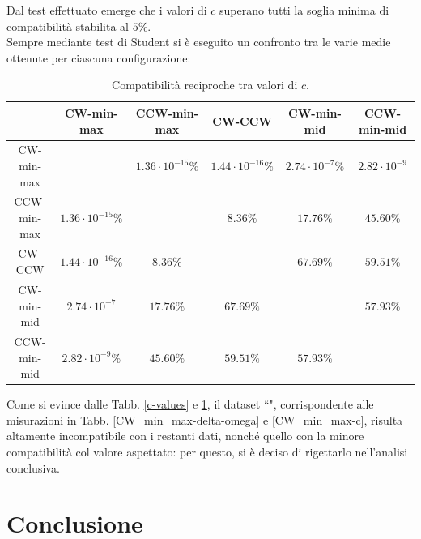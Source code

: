 \documentclass[]{article}
\let\oldsection\section%
\renewcommand{\section}{%
	\renewcommand{\theequation}{\thesection.\arabic{equation}}%
	\oldsection}%
\newcommand{\virgolette}[1]{``\text{#1}"}
\begin{document}
    Dal test effettuato emerge che i valori di $c$ superano tutti la soglia minima di compatibilità stabilita al $5\%$. \\
    Sempre mediante test di Student si è eseguito un confronto tra le varie medie ottenute per ciascuna configurazione:

    \begin{table}[H]
        \centering
        \begin{tabular}{||c|c|c|c|c|c||}
            \hline
            $ $ & CW-min-max & CCW-min-max & CW-CCW & CW-min-mid & CCW-min-mid \\
            \hline\hline
            CW-min-max & $ $ & $ 1.36\cdot 10^{-15}\% $ & $ 1.44\cdot 10^{-16}\% $ & $ 2.74\cdot 10^{-7}\% $ & $ 2.82\cdot 10^{-9} $ \\\hline
            CCW-min-max & $ 1.36\cdot 10^{-15}\% $ & $ $ & $ 8.36\% $ & $ 17.76\% $ & $ 45.60\% $ \\\hline
            CW-CCW & $ 1.44\cdot 10^{-16}\% $ & $ 8.36\% $ & $ $ & $ 67.69\% $ & $ 59.51\% $ \\\hline
            CW-min-mid & $ 2.74\cdot 10^{-7} $ & $ 17.76\% $ & $ 67.69\% $ & $ $ & $ 57.93\% $ \\\hline
            CCW-min-mid & $ 2.82\cdot 10^{-9}\% $ & $ 45.60\% $ & $ 59.51\% $ & $ 57.93\% $ & $ $ \\\hline
        \end{tabular}
        \caption{Compatibilità reciproche tra valori di $c$.}
        \label{comp}
    \end{table}

    Come si evince dalle Tabb. \ref{c-values} e \ref{comp}, il dataset \virgolette{CW-min-max}, corrispondente alle misurazioni in Tabb. \ref{CW_min_max-delta-omega} e \ref{CW_min_max-c}, risulta altamente incompatibile con i restanti dati, nonché quello con la minore compatibilità col valore aspettato: per questo, si è deciso di rigettarlo nell'analisi conclusiva.

    \section{Conclusione}
    
\end{document}
